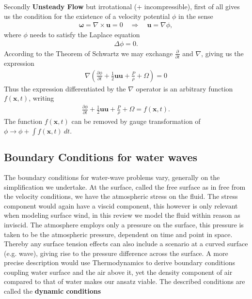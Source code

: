 Secondly \textbf{Unsteady Flow} but irrotational (+ incompressible), first of
all gives us the condition for the existence of a velocity potential $\phi$
in the sense
\begin{align}
    \mathbf{\omega} = \nabla \times  \mathbf{u} = 0  \quad \Rightarrow \quad
    \mathbf{u} = \nabla \phi,
\end{align}
where $\phi$ needs to satisfy the Laplace equation
\begin{align}
    \Delta \phi = 0.
\end{align}
According to the Theorem of Schwartz we may exchange $\frac{\partial
}{\partial t}$ and $\nabla$, giving us the expression
\begin{align}
    \nabla\left( \frac{\partial \phi}{\partial t} +\frac{1}{2}
    \mathbf{u}\mathbf{u} + \frac{P}{\rho}  + \Omega \right) = 0
\end{align}
Thus the expression differentiated by the $\nabla$ operator is an arbitrary
function $f(\mathbf{x}, t)$, writing
\begin{align}
     \frac{\partial \phi}{\partial t} +\frac{1}{2}
    \mathbf{u}\mathbf{u} + \frac{P}{\rho}  + \Omega = f(\mathbf{x}, t).
\end{align}
The function $f(\mathbf{x}, t)$ can be removed by gauge transformation of
$\phi \rightarrow \phi + \int f(\mathbf{x}, t)\ dt$.
\subsection{Boundary Conditions for water waves}
The boundary conditions for water-wave problems vary, generally on the
simplification we undertake. At the surface, called the free surface as in
free from the velocity conditions, we have the atmospheric stress on the
fluid. The stress component would again have a viscid component, this however
is only relevant when modeling surface wind, in this review we model the
fluid within reason as inviscid. The atmosphere employs
only a pressure on the surface, this pressure is taken to be the atmospheric
pressure, dependent on time and point in space. Thereby  any surface tension
effects can also include a scenario at a curved surface (e.g. wave), giving
rise to the pressure difference across the surface. A more precise
description would use Thermodynamics to derive boundary conditions coupling
water surface and the air above it, yet the density component of air
compared to that of water makes our ansatz viable. The described conditions
are called the \textbf{dynamic conditions}

